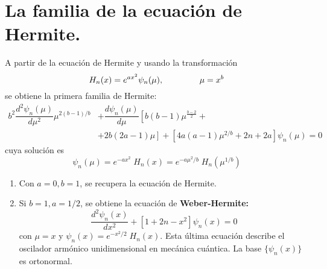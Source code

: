 \section{La familia de la ecuación de Hermite.}
A partir de la ecuación de Hermite y usando la transformación
\[ H_{n} (x) = e^{ax^{2}} \psi_{n}(\mu), \hspace{1.5cm} \mu = x^{b} \]
se obtiene la primera familia de Hermite:
\[ \begin{split}
 b^{2} \dfrac{d^{2} \psi_{n} (\mu)}{d \mu^{2}} \mu^{2(b-1)/b} &+ \dfrac{d \psi_{n}(\mu)}{d \mu} \left[ b(b - 1) \mu^{\frac{b - 2}{2}} +  \right. \\
&+ \left. 2b(2a - 1) \mu \right] + \left[ 4a (a - 1) \mu^{2/b} + 2n + 2a \right] \psi_{n} (\mu) = 0 \end{split}  \]
cuya solución es
\[ \psi_{n}(\mu) =  e^{-ax^{2}} \; H_{n}(x) = e^{-a \mu^{2} / b} \; H_{n}(\mu^{1/b}) \]
\begin{enumerate}
\item Con $a=0, b=1$, se recupera la ecuación de Hermite.
\item Si $b = 1, a = 1/2$, se obtiene la ecuación de \textbf{Weber-Hermite:}
\begin{equation}
\dfrac{d^{2} \psi_{n}(x)}{d x^{2}} + [1 + 2n - x^{2}] \psi_{n} (x) = 0
\label{eq:ecuacion_08_65}
\end{equation}
con $\mu = x$ y $\psi_{n}(x) = e^{-x^{2}/2} \; H_{n}(x)$. Esta última ecuación describe el oscilador armónico unidimensional en mecánica cuántica. La base $\{\psi_{n}(x)\}$ es ortonormal.
\end{enumerate}
